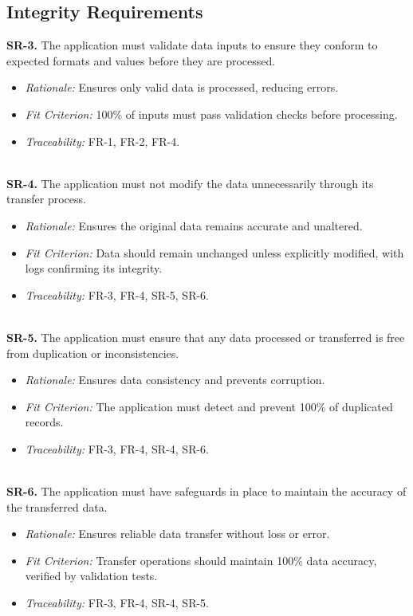 \documentclass[12pt]{article}
\begin{document}
\subsection{Integrity Requirements}
\textbf{SR-3.} The application must validate data inputs to ensure they
  conform to expected formats and values before they are processed.
  \begin{itemize}
    \item \textit{Rationale:} Ensures only valid data is processed, reducing
    errors.
    \item \textit{Fit Criterion:} 100\% of inputs must pass validation checks
    before processing.
    \item \textit{Traceability:} FR-1, FR-2, FR-4.
  \end{itemize}
\ \\
\textbf{SR-4.} The application must not modify the data unnecessarily
  through its transfer process.
  \begin{itemize}
    \item \textit{Rationale:} Ensures the original data remains accurate and
    unaltered.
    \item \textit{Fit Criterion:} Data should remain unchanged unless explicitly
    modified, with logs confirming its integrity.
    \item \textit{Traceability:} FR-3, FR-4, SR-5, SR-6.
  \end{itemize}
\ \\
\textbf{SR-5.} The application must ensure that any data processed or
  transferred is free from duplication or inconsistencies.
  \begin{itemize}
    \item \textit{Rationale:} Ensures data consistency and prevents corruption.
    \item \textit{Fit Criterion:} The application must detect and prevent 100\%
    of duplicated records.
    \item \textit{Traceability:} FR-3, FR-4, SR-4, SR-6.
  \end{itemize}
\ \\
\textbf{SR-6.} The application must have safeguards in place to
  maintain the accuracy of the transferred data.
  \begin{itemize}
    \item \textit{Rationale:} Ensures reliable data transfer without loss or
    error.
    \item \textit{Fit Criterion:} Transfer operations should maintain 100\% data
    accuracy, verified by validation tests.
    \item \textit{Traceability:} FR-3, FR-4, SR-4, SR-5.
  \end{itemize}
\end{document}
